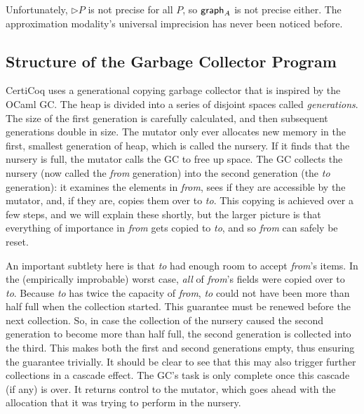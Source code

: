 Unfortunately, $\rhd P$ is not precise for all $P$, so $\mathsf{graph}_A$ is not precise either.  The approximation modality's universal imprecision has never been noticed before.

\subsection{Structure of the Garbage Collector Program}
\label{apx:gcstructure}


CertiCoq uses a generational copying garbage collector 
that is inspired by the OCaml GC. 
The heap is divided into a series of disjoint
spaces called \emph{generations}. The size of the first generation
is carefully calculated, and then subsequent generations
{\color{magenta}double in size}.
The mutator only ever allocates new memory in the first, 
smallest generation of heap, which is called the nursery. 
If it finds that the nursery is full, 
the mutator calls the GC to free up space.
The GC collects the nursery 
(now called the \emph{from} generation)
into the second generation (the \emph{to} generation): 
it examines the elements 
in \emph{from}, sees if they are accessible by
the mutator, and, if they are, 
copies them over to \emph{to}. This copying is achieved over a few steps, 
and we will explain these shortly, but the larger picture is that 
everything of importance in \emph{from} gets copied to \emph{to}, 
and so \emph{from} can safely be reset. 

An important subtlety here is that \emph{to} had enough 
room to accept \emph{from}'s items. 
In the (empirically improbable) worst case, 
\emph{all} of \emph{from}'s fields were copied over to \emph{to}.
Because \emph{to} has twice the capacity of \emph{from},
\emph{to} could not have been more than half full when 
the collection started.
This guarantee must be renewed before the next collection. 
So, in case the collection of the nursery caused
the second generation to become more than half full, 
the second generation is collected into the third. This makes 
both the first and second generations empty, thus ensuring 
the guarantee trivially. It should be 
clear to see that this may also trigger further collections in 
a cascade effect. The GC's task is only complete once this 
cascade (if any) is over. It returns control to the mutator,
which goes ahead with 
the allocation that it was trying to perform in the nursery.

